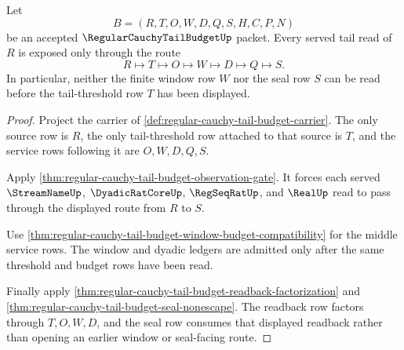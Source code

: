 \begin{theorem}
\label{thm:regular-cauchy-tail-budget-tail-threshold-service-exactness}
Let
$$
B=(R,T,O,W,D,Q,S,H,C,P,N)
$$
be an accepted $\RegularCauchyTailBudgetUp$ packet. Every served tail read of $R$ is exposed only through the route
$$
R \longmapsto T \longmapsto O \longmapsto W \longmapsto D \longmapsto Q \longmapsto S.
$$
In particular, neither the finite window row $W$ nor the seal row $S$ can be read before the tail-threshold row $T$ has been displayed.
\end{theorem}
\begin{proof}
Project the carrier of \autoref{def:regular-cauchy-tail-budget-carrier}. The only source row is $R$, the only tail-threshold row attached to that source is $T$, and the service rows following it are $O,W,D,Q,S$.

Apply \autoref{thm:regular-cauchy-tail-budget-observation-gate}. It forces each served $\StreamNameUp$, $\DyadicRatCoreUp$, $\RegSeqRatUp$, and $\RealUp$ read to pass through the displayed route from $R$ to $S$.

Use \autoref{thm:regular-cauchy-tail-budget-window-budget-compatibility} for the middle service rows. The window and dyadic ledgers are admitted only after the same threshold and budget rows have been read.

Finally apply \autoref{thm:regular-cauchy-tail-budget-readback-factorization} and \autoref{thm:regular-cauchy-tail-budget-seal-nonescape}. The readback row factors through $T,O,W,D$, and the seal row consumes that displayed readback rather than opening an earlier window or seal-facing route.
\end{proof}

